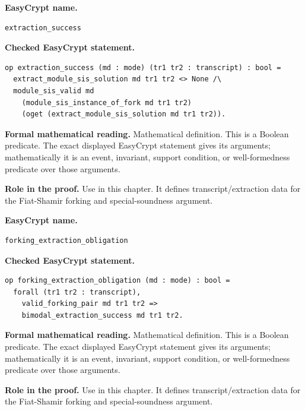 \begin{formaldefinition}
\noindent\textbf{EasyCrypt name.}
\begin{lstlisting}[language=EasyCrypt,basicstyle=\ttfamily\scriptsize]
extraction_success
\end{lstlisting}
\noindent\textbf{Checked EasyCrypt statement.}
\begin{lstlisting}[language=EasyCrypt,basicstyle=\ttfamily\scriptsize]
op extraction_success (md : mode) (tr1 tr2 : transcript) : bool =
  extract_module_sis_solution md tr1 tr2 <> None /\
  module_sis_valid md
    (module_sis_instance_of_fork md tr1 tr2)
    (oget (extract_module_sis_solution md tr1 tr2)).
\end{lstlisting}
\noindent\textbf{Formal mathematical reading.}
Mathematical definition. This is a Boolean predicate.  The exact displayed EasyCrypt statement gives its arguments; mathematically it is an event, invariant, support condition, or well-formedness predicate over those arguments.

\noindent\textbf{Role in the proof.}
Use in this chapter. It defines transcript/extraction data for the Fiat-Shamir forking and special-soundness argument.

\end{formaldefinition}

\begin{formaldefinition}
\noindent\textbf{EasyCrypt name.}
\begin{lstlisting}[language=EasyCrypt,basicstyle=\ttfamily\scriptsize]
forking_extraction_obligation
\end{lstlisting}
\noindent\textbf{Checked EasyCrypt statement.}
\begin{lstlisting}[language=EasyCrypt,basicstyle=\ttfamily\scriptsize]
op forking_extraction_obligation (md : mode) : bool =
  forall (tr1 tr2 : transcript),
    valid_forking_pair md tr1 tr2 =>
    bimodal_extraction_success md tr1 tr2.
\end{lstlisting}
\noindent\textbf{Formal mathematical reading.}
Mathematical definition. This is a Boolean predicate.  The exact displayed EasyCrypt statement gives its arguments; mathematically it is an event, invariant, support condition, or well-formedness predicate over those arguments.

\noindent\textbf{Role in the proof.}
Use in this chapter. It defines transcript/extraction data for the Fiat-Shamir forking and special-soundness argument.

\end{formaldefinition}

